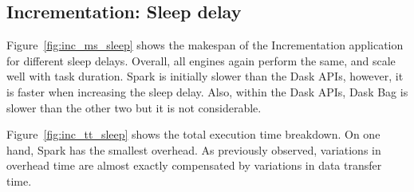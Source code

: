 \documentclass[conference]{IEEEtran}
\begin{document}
\subsection{Incrementation: Sleep delay}
Figure~\ref{fig:inc_ms_sleep} shows the makespan of the Incrementation
application for different sleep delays. Overall, all engines again perform the same, and scale well with task duration.
 Spark is initially slower than the
Dask APIs, however, it is faster when increasing the sleep delay. Also,
within the Dask APIs, Dask Bag is slower than the other two but it is not
considerable.

Figure~\ref{fig:inc_tt_sleep} shows the total execution time breakdown. On
one hand, Spark has the smallest overhead. As previously observed,
variations in overhead time are almost exactly compensated by variations in data
transfer time.

\end{document}
